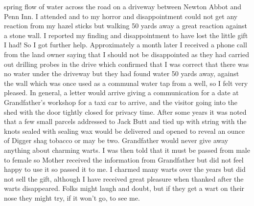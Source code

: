 spring flow of water across the road on a driveway between Newton Abbot and
Penn Inn. I attended and to my horror and disappointment could not get any
reaction from my hazel sticks but walking 50 yards away a great reaction
against a stone wall. I reported my finding and disappointment to have lost
the little gift I had! So I got further help. Approximately a month later I
received a phone call from the land owner saying that I should not be
disappointed as they had carried out drilling probes in the drive which
confirmed that I was correct that there was no water under the driveway but
they had found water 50 yards away, against the wall which was once used as a
communal water tap from a well, so I felt very pleased. In general, a letter
would arrive giving a communication for a date at Grandfather's workshop for a
taxi car to arrive, and the visitor going into the shed with the door tightly
closed for privacy time. After some years it was noted that a few small
parcels addressed to Jack Butt and tied up with string with the knots sealed
with sealing wax would be delivered and opened to reveal an ounce of Digger
shag tobacco or may be two. Grandfather would never give away anything about
charming warts. I was then told that it must be passed from male to female so
Mother received the information from Grandfather but did not feel happy to use
it so passed it to me. I charmed many warts over the years but did not sell
the gift, although I have received great pleasure when thanked after the warts
disappeared. Folks might laugh and doubt, but if they get a wart on their nose
they might try, if it won't go, to see me.

